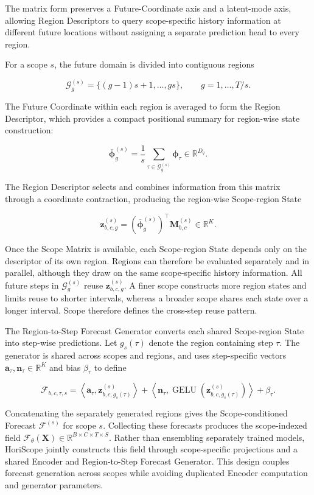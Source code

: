 \documentclass[final,3p,times]{elsarticle}
\begin{document}
The matrix form preserves a Future-Coordinate axis and a latent-mode axis, allowing Region Descriptors to query scope-specific history information at different future locations without assigning a separate prediction head to every region.

For a scope $s$, the future domain is divided into contiguous regions

\[
\mathcal G_g^{(s)}
=
\{(g-1)s+1,\ldots,gs\},
\qquad
g=1,\ldots,T/s.
\]


The Future Coordinate within each region is averaged to form the Region Descriptor, which provides a compact positional summary for region-wise state construction:

\[
\overline{\boldsymbol\phi}_g^{(s)}
=
\frac{1}{s}
\sum_{\tau\in\mathcal G_g^{(s)}}
\boldsymbol\phi_\tau
\in\mathbb R^{D_q}.
\]


The Region Descriptor selects and combines information from this matrix through a coordinate contraction, producing the region-wise Scope-region State

\[
\mathbf z_{b,c,g}^{(s)}
=
\left(\overline{\boldsymbol\phi}_g^{(s)}\right)^\top
\mathbf M_{b,c}^{(s)}
\in\mathbb R^K.
\]


Once the Scope Matrix is available, each Scope-region State depends only on the descriptor of its own region. Regions can therefore be evaluated separately and in parallel, although they draw on the same scope-specific history information. All future steps in $\mathcal G_g^{(s)}$ reuse $\mathbf z_{b,c,g}^{(s)}$. A finer scope constructs more region states and limits reuse to shorter intervals, whereas a broader scope shares each state over a longer interval. Scope therefore defines the cross-step reuse pattern.

The Region-to-Step Forecast Generator converts each shared Scope-region State into step-wise predictions. Let $g_s(\tau)$ denote the region containing step $\tau$. The generator is shared across scopes and regions, and uses step-specific vectors $\mathbf a_\tau,\mathbf n_\tau\in\mathbb R^K$ and bias $\beta_\tau$ to define

\[
\mathcal F_{b,c,\tau,s}
=
\left\langle
\mathbf a_\tau,
\mathbf z_{b,c,g_s(\tau)}^{(s)}
\right\rangle
+
\left\langle
\mathbf n_\tau,
\operatorname{GELU}\!\left(
\mathbf z_{b,c,g_s(\tau)}^{(s)}
\right)
\right\rangle
+
\beta_\tau.
\]


Concatenating the separately generated regions gives the Scope-conditioned Forecast $\mathcal F^{(s)}$ for scope $s$. Collecting these forecasts produces the scope-indexed field $\mathcal F_\theta(\mathbf X)\in\mathbb R^{B\times C\times T\times S}$. Rather than ensembling separately trained models, HoriScope jointly constructs this field through scope-specific projections and a shared Encoder and Region-to-Step Forecast Generator. This design couples forecast generation across scopes while avoiding duplicated Encoder computation and generator parameters.
\end{document}

